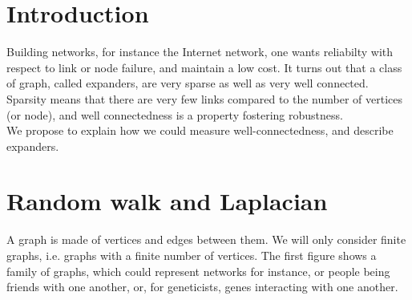 \documentclass[a0,portrait]{a0poster}
\begin{document}
\begin{multicols}{2} %


\color{Navy} %




\section*{Introduction}

Building networks, for instance the Internet network, one wants reliabilty with respect to link or node failure, and maintain a low cost. It turns out that a class of graph, called expanders, are very sparse as well as very well connected. Sparsity means that there are very few links compared to the number of vertices (or node), and well connectedness is a property fostering robustness.\\

We propose to explain how we could measure well-connectedness, and describe expanders.

 
\color{DarkSlateGray} %

\section*{Random walk and Laplacian}

A graph is made of vertices and edges between them. We will only consider finite graphs, i.e. graphs with a finite number of vertices. The first figure shows a family of graphs, which could represent networks for instance, or people being friends with one another, or, for geneticists, genes interacting with one another.\\


\end{multicols}
\end{document}
